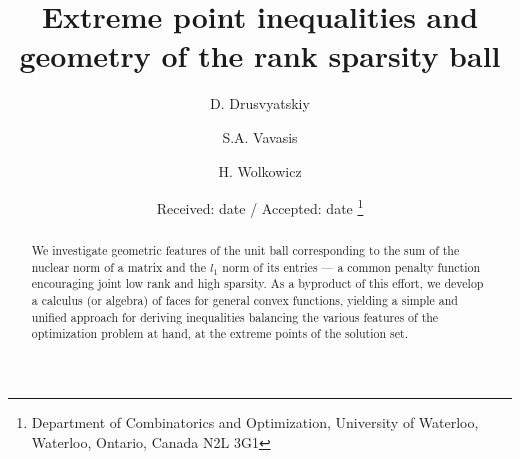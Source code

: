 \documentclass[smallextended,numbook]{svjour3}
\begin{document}
\title{Extreme point inequalities and geometry of the rank sparsity ball
}

\author{D. Drusvyatskiy         \and
        S.A. Vavasis \and H. Wolkowicz
}


\date{Received: date / Accepted: date \footnote{Department of Combinatorics and Optimization, University of Waterloo, Waterloo, Ontario, Canada N2L 3G1}}

\maketitle

\begin{abstract}
We investigate geometric features of the unit ball corresponding to the sum of the nuclear norm of a matrix and the $l_1$ norm of its entries --- a common penalty function encouraging joint low rank and high sparsity. As a byproduct of this effort, we develop a calculus (or algebra) of faces for general convex functions, yielding a simple and unified approach for deriving inequalities balancing the various  features of the optimization problem at hand, 
at the extreme points of the solution set. 

 
\end{abstract}
\end{document}
